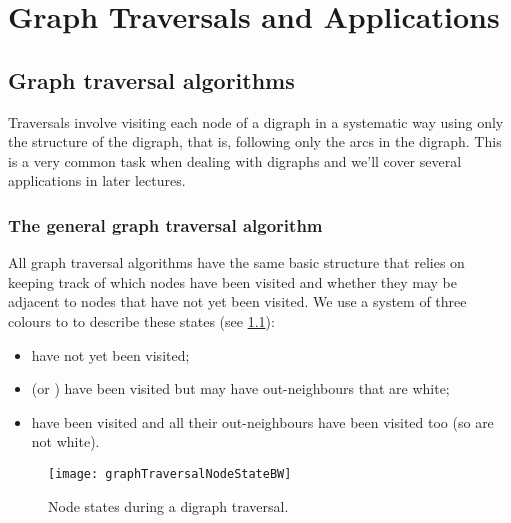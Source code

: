 \part{Graph Traversals and Applications}
\label{ch:traversal}


\chapter{Graph traversal algorithms}

Traversals involve visiting each node of a digraph in a systematic way using only the structure of the digraph, that is, following only the arcs in the digraph. 
This is a very common task when dealing with digraphs and we'll cover several applications in later lectures.


\section{The general graph traversal algorithm}
\label{sec:trav}

All graph traversal algorithms  have the same basic structure  that relies on keeping track of which nodes have been visited and whether they may be adjacent to nodes that have not yet been visited. We use a system of three colours to to describe these states (see  \cref{fig:travcols}):
\begin{itemize} 
\item {} have not yet been visited;
\item {} (or ) have been visited but may have 
 out-neighbours that are white;
\item {} have been visited and all their out-neighbours have been visited too (so are not white). 
\end{itemize}
\begin{figure}
  \centering
  \texttt{[image: graphTraversalNodeStateBW]}
  \caption{Node states during a digraph traversal.}
  \label{fig:travcols}
\end{figure}


